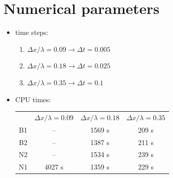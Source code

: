 \section{Numerical parameters}
\begin{itemize}
\item time steps:
	\begin{enumerate}
    \item $\Delta x / \lambda = 0.09  \rightarrow \Delta t = 0.005 $
    \item $\Delta x / \lambda = 0.18  \rightarrow \Delta t = 0.025 $
    \item $\Delta x / \lambda = 0.35  \rightarrow \Delta t = 0.1 $
  \end{enumerate}
\item CPU times: \\
\begin{tabular}{cccc}
 & $\Delta x / \lambda = 0.09 $ &$\Delta x / \lambda = 0.18 $&$\Delta x / \lambda = 0.35 $\\
 B1 & -- & 1569 s & 209 s \\
 B2 & -- & 1387 s & 211 s \\
 N2 & -- & 1534 s & 239 s \\
 N1 & 4027 s & 1359 s & 229 s\\

\end{tabular}
\end{itemize}

